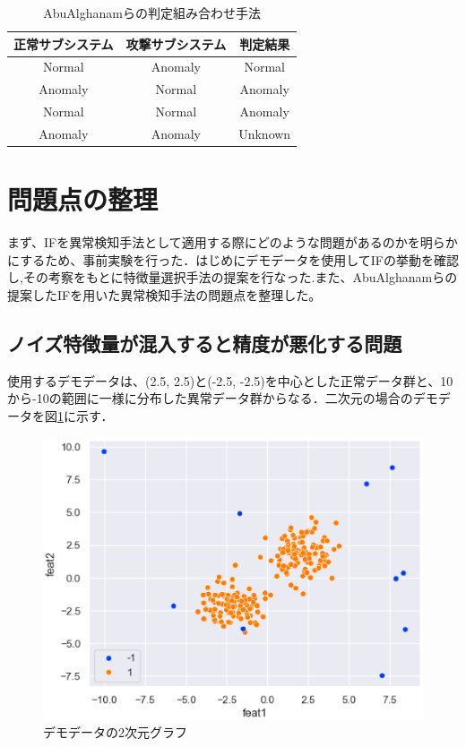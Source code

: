 \documentclass{css}
\begin{document}
\begin{table}[ht]
    \caption{AbuAlghanamらの判定組み合わせ手法}
    \centering
    \footnotesize
    \begin{tabular}{ccc}
        \hline\hline
        正常サブシステム & 攻撃サブシステム & 判定結果\\
        \hline
        Normal & Anomaly & Normal \\
        Anomaly & Normal & Anomaly \\
        Normal & Normal & Anomaly \\
        Anomaly & Anomaly & Unknown \\
        \hline
    \end{tabular}
    \label{tab:combination}
\end{table}


\section{問題点の整理}
まず、IFを異常検知手法として適用する際にどのような問題があるのかを明らかにするため、事前実験を行った．はじめにデモデータを使用してIFの挙動を確認し,その考察をもとに特徴量選択手法の提案を行なった.また、AbuAlghanamらの提案したIFを用いた異常検知手法\cite{AbuAlghanam2023-sx}の問題点を整理した。

\subsection{ノイズ特徴量が混入すると精度が悪化する問題}
使用するデモデータは、(2.5, 2.5)と(-2.5, -2.5)を中心とした正常データ群と、10から-10の範囲に一様に分布した異常データ群からなる．二次元の場合のデモデータを図\ref{fig:demodata}に示す．

\begin{figure}[ht]
    \centering
    \includegraphics[width=\linewidth]{pictures/eps/demodata.eps}
    \caption{デモデータの2次元グラフ}
    \label{fig:demodata}
\end{figure}
\end{document}

